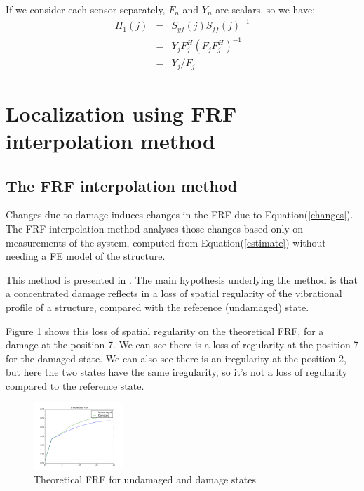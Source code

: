 \documentclass[journal]{IEEEtran}
\begin{document}
\begin{remark}
If we consider each sensor separately, $F_n$ and $Y_n$ are scalars, so we have:
\begin{equation}
\begin{array}{lll}
H_1(j) & = & S_{yf}(j) S_{ff}(j)^{-1} \\
& = & Y_j F_j^H (F_j F_j^H)^{-1} \\
& = & Y_j / F_j
\end{array}
\label{estimate}
\end{equation}
\end{remark}

\section{Localization using FRF interpolation method}

\subsection{The FRF interpolation method}

Changes due to damage induces changes in the FRF due to Equation(\ref{changes}). The FRF interpolation method analyses those changes based only on measurements of the system, computed from Equation(\ref{estimate}) without needing a FE model of the structure.

This method is presented in \cite{dilena2015damage}.
The main hypothesis underlying the method is that a concentrated damage reflects in a loss of spatial regularity of the
vibrational profile of a structure, compared with the reference (undamaged) state.

Figure \ref{theo} shows this loss of spatial regularity on the theoretical FRF, for a damage at the position 7.
We can see there is a loss of regularity at the position 7 for the damaged state. We can also see there is an iregularity at the position 2, but here the two states have the same iregularity, so it's not a loss of regularity compared to the reference state.

\begin{figure}[h!]
  \centering
  \includegraphics[width=0.3\textwidth]{images/theo60.png}
  \caption{Theoretical FRF for undamaged and damage states}
  \label{theo}
\end{figure}
\end{document}
